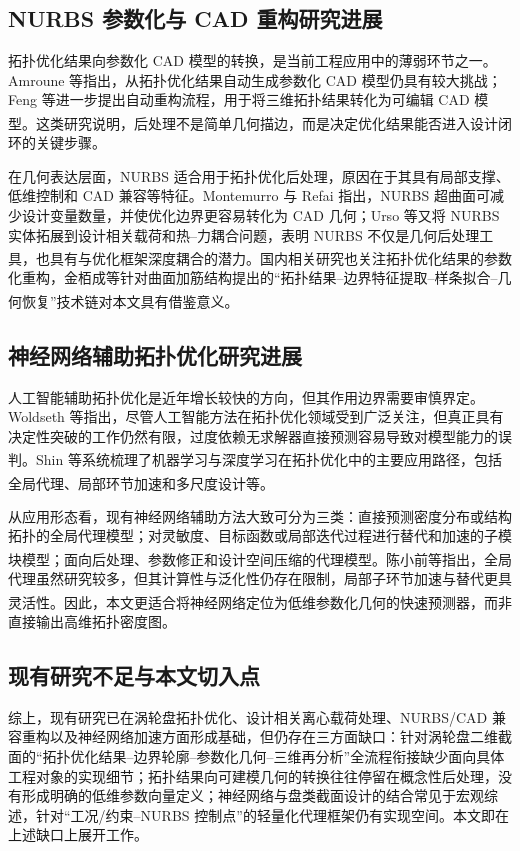 \documentclass{FRB-style}
\let\oldcite\cite
\renewcommand{\cite}[1]{\textsuperscript{\oldcite{#1}}}
\begin{document}
\subsection{NURBS 参数化与 CAD 重构研究进展}

拓扑优化结果向参数化 CAD 模型的转换，是当前工程应用中的薄弱环节之一。Amroune 等指出，从拓扑优化结果自动生成参数化 CAD 模型仍具有较大挑战；Feng 等进一步提出自动重构流程，用于将三维拓扑结果转化为可编辑 CAD 模型\cite{Amroune2022,Feng2025,Ren2025}。这类研究说明，后处理不是简单几何描边，而是决定优化结果能否进入设计闭环的关键步骤。

在几何表达层面，NURBS 适合用于拓扑优化后处理，原因在于其具有局部支撑、低维控制和 CAD 兼容等特征。Montemurro 与 Refai 指出，NURBS 超曲面可减少设计变量数量，并使优化边界更容易转化为 CAD 几何；Urso 等又将 NURBS 实体拓展到设计相关载荷和热--力耦合问题，表明 NURBS 不仅是几何后处理工具，也具有与优化框架深度耦合的潜力\cite{Montemurro2021,Urso2024DDL,Urso2024TM}。国内相关研究也关注拓扑优化结果的参数化重构，金栢成等针对曲面加筋结构提出的“拓扑结果--边界特征提取--样条拟合--几何恢复”技术链对本文具有借鉴意义\cite{Jin2024}。

\subsection{神经网络辅助拓扑优化研究进展}

人工智能辅助拓扑优化是近年增长较快的方向，但其作用边界需要审慎界定。Woldseth 等指出，尽管人工智能方法在拓扑优化领域受到广泛关注，但真正具有决定性突破的工作仍然有限，过度依赖无求解器直接预测容易导致对模型能力的误判\cite{Woldseth2022}。Shin 等系统梳理了机器学习与深度学习在拓扑优化中的主要应用路径，包括全局代理、局部环节加速和多尺度设计等\cite{Shin2023}。

从应用形态看，现有神经网络辅助方法大致可分为三类：直接预测密度分布或结构拓扑的全局代理模型；对灵敏度、目标函数或局部迭代过程进行替代和加速的子模块模型；面向后处理、参数修正和设计空间压缩的代理模型\cite{Deng2022,Kong2024,Rastegarzadeh2023,Chandrasekhar2023,Persia2025}。陈小前等指出，全局代理虽然研究较多，但其计算性与泛化性仍存在限制，局部子环节加速与替代更具灵活性\cite{Chen2024review}。因此，本文更适合将神经网络定位为低维参数化几何的快速预测器，而非直接输出高维拓扑密度图。

\subsection{现有研究不足与本文切入点}

综上，现有研究已在涡轮盘拓扑优化、设计相关离心载荷处理、NURBS/CAD 兼容重构以及神经网络加速方面形成基础，但仍存在三方面缺口：针对涡轮盘二维截面的“拓扑优化结果--边界轮廓--参数化几何--三维再分析”全流程衔接缺少面向具体工程对象的实现细节；拓扑结果向可建模几何的转换往往停留在概念性后处理，没有形成明确的低维参数向量定义；神经网络与盘类截面设计的结合常见于宏观综述，针对“工况/约束--NURBS 控制点”的轻量化代理框架仍有实现空间。本文即在上述缺口上展开工作。
\end{document}
